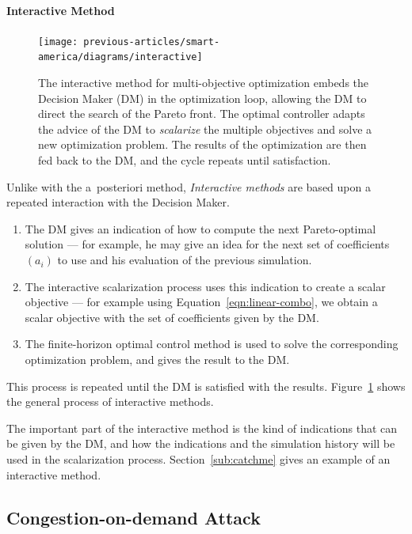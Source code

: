 			\paragraph{Interactive Method}
				\begin{figure}[ht]
					\centering
					  \texttt{[image: previous-articles/smart-america/diagrams/interactive]}
					\caption[The interactive method for multi-objective optimization embeds the Decision Maker (DM) in the optimization loop, allowing the DM to direct the search of the Pareto front.]{The interactive method for multi-objective optimization embeds the Decision Maker (DM) in the optimization loop, allowing the DM to direct the search of the Pareto front. The optimal controller adapts the advice of the DM to \emph{scalarize} the multiple objectives and solve a new optimization problem. The results of the optimization are then fed back to the DM, and the cycle repeats until satisfaction.}
					\label{fig:interactive}
				\end{figure}
				Unlike with the a~posteriori method, \emph{Interactive methods} are based upon a repeated interaction with the Decision Maker.
				\begin{enumerate}
					\item The DM gives an indication of how to compute the next Pareto-optimal solution --- for example, he may give an idea for the next set of coefficients $(a_i)$ to use and his evaluation of the previous simulation.
					\item The interactive scalarization process uses this indication to create a scalar objective --- for example using Equation~\eqref{eqn:linear-combo}, we obtain a scalar objective with the set of coefficients given by the DM.
					\item The finite-horizon optimal control method is used to solve the corresponding optimization problem, and gives the result to the DM.
				\end{enumerate}
				This process is repeated until the DM is satisfied with the results. Figure~\ref{fig:interactive} shows the general process of interactive methods.

				The important part of the interactive method is the kind of indications that can be given by the DM, and how the indications and the simulation history will be used in the scalarization process. Section~\ref{sub:catchme} gives an example of an interactive method.

\subsection{Congestion-on-demand Attack}
\label{sub:congestion-on-demand}

